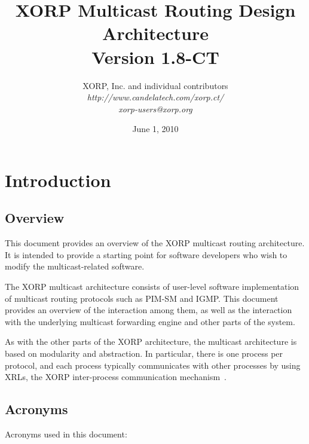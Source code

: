 \documentclass[11pt]{article}
\begin{document}
\title{XORP Multicast Routing Design Architecture \\
\vspace{1ex}
Version 1.8-CT}
\author{ XORP, Inc. and individual contributors		\\
         {\it http://www.candelatech.com/xorp.ct/}			\\
	 {\it xorp-users@xorp.org}
}
\date{June 1, 2010}

\maketitle


\section{Introduction}


\subsection{Overview}

This document provides an overview of the XORP multicast routing
architecture.  It is intended to provide a starting point for software
developers who wish to modify the multicast-related software.

The XORP multicast architecture consists of user-level software
implementation of multicast routing protocols such as PIM-SM and IGMP.
This document provides an overview of the interaction among them,
as well as the interaction with the underlying multicast forwarding
engine and other parts of the system.

As with the other parts of the XORP architecture, the multicast
architecture is based on modularity and abstraction.
In particular, there is one process per protocol, and each process
typically communicates with other processes by using XRLs, the XORP
inter-process communication mechanism~\cite{xorp:xrl}.

\subsection{Acronyms}

Acronyms used in this document:
\end{document}

